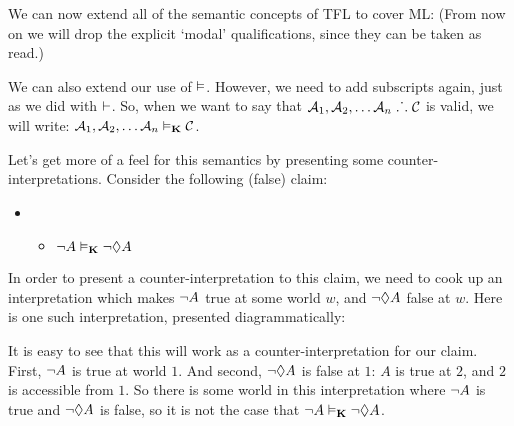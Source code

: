 We can now extend all of the semantic concepts of TFL to cover ML:
(From now on we will drop the explicit `modal' qualifications, since they can be taken as read.)

We can also extend our use of $\vDash$. However, we need to add subscripts again, just as we did with $\vdash$. So, when we want to say that $\mathcal{A}_1,\mathcal{A}_2, \dots \mathcal{A}_n\mathrel{\ldotp\dot{}\,\ldotp}\mathcal{C}$ is valid, we will write: $\mathcal{A}_1,\mathcal{A}_2, \dots \mathcal{A}_n\vDash_{\mathbf{K}}\mathcal{C}$. 

Let's get more of a feel for this semantics by presenting some counter-interpretations. Consider the following (false) claim:
\begin{itemize}
	\item[]
	      \begin{itemize}
		      \item[]$\neg A\vDash_{\mathbf{K}} \neg \Diamond A$
	      \end{itemize}
\end{itemize}
In order to present a counter-interpretation to this claim, we need to cook up an interpretation which makes $\neg A$ true at some world $w$, and $\neg\Diamond A$ false at $w$. Here is one such interpretation, presented diagrammatically:
\begin{center}
\end{center}
It is easy to see that this will work as a counter-interpretation for our claim. First, $\neg A$ is true at world $1$. And second, $\neg\Diamond A$ is false at $1$: $A$ is true at $2$, and $2$ is accessible from $1$. So there is some world in this interpretation where $\neg A$ is true and $\neg\Diamond A$ is false, so it is not the case that $\neg A\vDash_{\mathbf{K}}\neg\Diamond A$.

